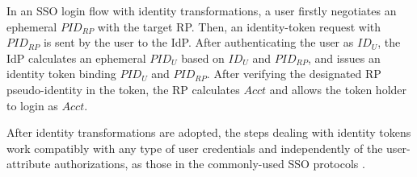 In an SSO login flow with identity transformations,
    a user firstly negotiates an ephemeral $PID_{RP}$ with the target RP.
Then, an identity-token request with $PID_{RP}$ is sent by the user to the IdP.
After authenticating the user as $ID_U$, the IdP calculates an ephemeral $PID_U$ based on $ID_U$ and $PID_{RP}$,
    and issues an identity token binding $PID_U$ and $PID_{RP}$.
After verifying the designated RP pseudo-identity in the token,
    the RP calculates $Acct$ and allows the token holder to login as $Acct$.

After identity transformations are adopted,
    the steps dealing with identity tokens work compatibly with any type of user credentials
        and independently of the user-attribute authorizations,
        as those in the commonly-used SSO protocols \cite{OpenIDConnect,rfc6749,SAML,NIST2017draft}.


